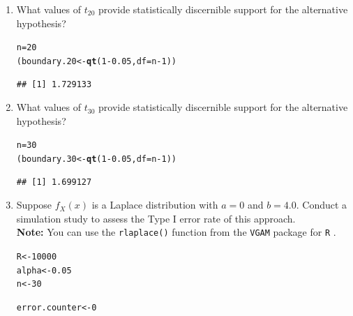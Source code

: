 \documentclass{article}\usepackage[]{graphicx}\usepackage[]{xcolor}
\makeatletter
\newcommand{\hlnum}[1]{\textcolor[rgb]{0.686,0.059,0.569}{#1}}%
\newcommand{\hlopt}[1]{\textcolor[rgb]{0,0,0}{#1}}%
\newcommand{\hldef}[1]{\textcolor[rgb]{0.345,0.345,0.345}{#1}}%
\newcommand{\hlkwb}[1]{\textcolor[rgb]{0.69,0.353,0.396}{#1}}%
\newcommand{\hlkwc}[1]{\textcolor[rgb]{0.333,0.667,0.333}{#1}}%
\newcommand{\hlkwd}[1]{\textcolor[rgb]{0.737,0.353,0.396}{\textbf{#1}}}%
\newenvironment{kframe}{%
 \def\at@end@of@kframe{}%
 \ifinner\ifhmode%
  \def\at@end@of@kframe{\end{minipage}}%
  \begin{minipage}{\columnwidth}%
 \fi\fi%
 \def\FrameCommand##1{\hskip\@totalleftmargin \hskip-\fboxsep
 \colorbox{shadecolor}{##1}\hskip-\fboxsep
     \hskip-\linewidth \hskip-\@totalleftmargin \hskip\columnwidth}%
 \MakeFramed {\advance\hsize-\width
   \@totalleftmargin\z@ \linewidth\hsize
   \@setminipage}}%
 {\par\unskip\endMakeFramed%
 \at@end@of@kframe}
\newenvironment{knitrout}{}{} %
\makeatother
\begin{document}
\begin{enumerate}
\begin{enumerate}
  \item What values of $t_{20}$ provide statistically discernible support for the
  alternative hypothesis? 
\begin{knitrout}\scriptsize
{}\color{fgcolor}\begin{kframe}
\begin{alltt}
\hldef{n} \hlkwb{=}\hlnum{20}
\hldef{(boundary.20} \hlkwb{<-} \hlkwd{qt}\hldef{(}\hlnum{1}\hlopt{-}\hlnum{0.05}\hldef{,}\hlkwc{df} \hldef{= n}\hlopt{-}\hlnum{1}\hldef{))}
\end{alltt}
\begin{verbatim}
## [1] 1.729133
\end{verbatim}
\end{kframe}
\end{knitrout}
  \item What values of $t_{30}$ provide statistically discernible support for the
  alternative hypothesis?
\begin{knitrout}\scriptsize
{}\color{fgcolor}\begin{kframe}
\begin{alltt}
\hldef{n} \hlkwb{=}\hlnum{30}
\hldef{(boundary.30} \hlkwb{<-} \hlkwd{qt}\hldef{(}\hlnum{1}\hlopt{-}\hlnum{0.05}\hldef{,}\hlkwc{df} \hldef{= n}\hlopt{-}\hlnum{1}\hldef{))}
\end{alltt}
\begin{verbatim}
## [1] 1.699127
\end{verbatim}
\end{kframe}
\end{knitrout}

  \item Suppose $f_X(x)$ is a Laplace distribution with $a=0$ and $b=4.0$.
  Conduct a simulation study to assess the Type I error rate of this approach.\\
  \textbf{Note:} You can use the \texttt{rlaplace()} function from the \texttt{VGAM}
  package for \texttt{R} \citep{VGAM}.
\begin{knitrout}\scriptsize
{}\color{fgcolor}\begin{kframe}
\begin{alltt}
\hldef{R} \hlkwb{<-} \hlnum{10000}
\hldef{alpha} \hlkwb{<-} \hlnum{0.05}
\hldef{n}\hlkwb{<-} \hlnum{30}

\hldef{error.counter} \hlkwb{<-} \hlnum{0}


\end{alltt}
\end{kframe}
\end{knitrout}
\end{enumerate}
\end{enumerate}
\end{document}
